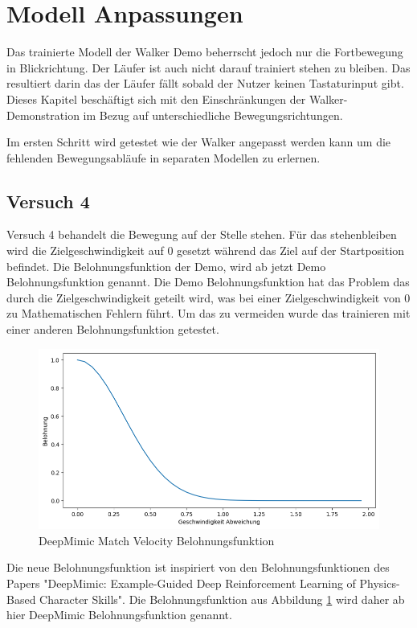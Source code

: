 \section{Modell Anpassungen}
Das trainierte Modell der Walker Demo beherrscht jedoch nur die Fortbewegung in Blickrichtung. Der Läufer ist auch nicht darauf trainiert stehen zu bleiben. Das resultiert darin das der Läufer fällt sobald der Nutzer keinen Tastaturinput gibt. Dieses Kapitel beschäftigt sich mit den Einschränkungen der Walker-Demonstration im Bezug auf unterschiedliche Bewegungsrichtungen.

Im ersten Schritt wird getestet wie der Walker angepasst werden kann um die fehlenden Bewegungsabläufe in separaten Modellen zu erlernen.

\subsection{Versuch 4}
Versuch 4 behandelt die Bewegung auf der Stelle stehen. Für das stehenbleiben wird die Zielgeschwindigkeit auf 0 gesetzt während das Ziel auf der Startposition befindet. Die Belohnungsfunktion der Demo, wird ab jetzt Demo Belohnungsfunktion genannt. Die Demo Belohnungsfunktion hat das Problem das durch die Zielgeschwindigkeit geteilt wird, was bei einer Zielgeschwindigkeit von 0 zu Mathematischen Fehlern führt. Um das zu vermeiden wurde das trainieren mit einer anderen Belohnungsfunktion getestet.
\begin{figure}[H]
  \centering  
  \includegraphics[scale=0.5]{img/match_velocity_exp.png}
  \caption{DeepMimic Match Velocity Belohnungsfunktion}
  \label{fig:match_velocity_exp}
\end{figure}
Die neue Belohnungsfunktion ist inspiriert von den Belohnungsfunktionen des Papers "DeepMimic: Example-Guided Deep Reinforcement Learning of Physics-Based Character Skills".\cite{peng2018deepmimic}
Die Belohnungsfunktion aus Abbildung \ref{fig:match_velocity_exp} wird daher ab hier DeepMimic Belohnungsfunktion genannt.

